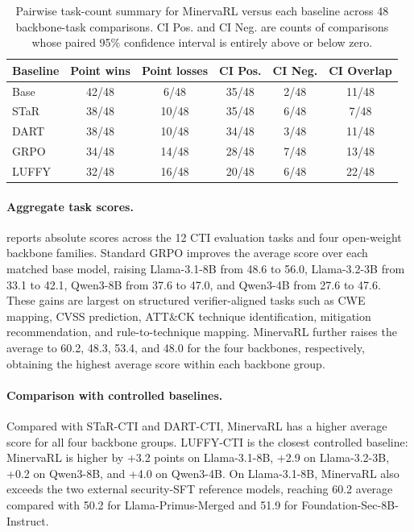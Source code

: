 \begin{table}[t]
\centering
\scriptsize
\caption{Pairwise task-count summary for MinervaRL versus each baseline across 48 backbone-task comparisons. CI Pos. and CI Neg. are counts of comparisons whose paired 95\% confidence interval is entirely above or below zero.}
\label{tab:pairwise-ci-summary}
\setlength{\tabcolsep}{4pt}
\renewcommand{\arraystretch}{0.95}
\begin{tabular}{lccccc}
\toprule
Baseline & Point wins & Point losses & CI Pos. & CI Neg. & CI Overlap \\
\midrule
Base & 42/48 & 6/48 & 35/48 & 2/48 & 11/48 \\
STaR & 38/48 & 10/48 & 35/48 & 6/48 & 7/48 \\
DART & 38/48 & 10/48 & 34/48 & 3/48 & 11/48 \\
GRPO & 34/48 & 14/48 & 28/48 & 7/48 & 13/48 \\
LUFFY & 32/48 & 16/48 & 20/48 & 6/48 & 22/48 \\
\bottomrule
\end{tabular}
\end{table}

\paragraph{Aggregate task scores.}
 reports absolute scores across the 12 CTI evaluation tasks and four open-weight backbone families. Standard GRPO improves the average score over each matched base model, raising Llama-3.1-8B from 48.6 to 56.0, Llama-3.2-3B from 33.1 to 42.1, Qwen3-8B from 37.6 to 47.0, and Qwen3-4B from 27.6 to 47.6. These gains are largest on structured verifier-aligned tasks such as CWE mapping, CVSS prediction, ATT\&CK technique identification, mitigation recommendation, and rule-to-technique mapping. MinervaRL further raises the average to 60.2, 48.3, 53.4, and 48.0 for the four backbones, respectively, obtaining the highest average score within each backbone group.

\paragraph{Comparison with controlled baselines.}
Compared with STaR-CTI and DART-CTI, MinervaRL has a higher average score for all four backbone groups. LUFFY-CTI is the closest controlled baseline: MinervaRL is higher by +3.2 points on Llama-3.1-8B, +2.9 on Llama-3.2-3B, +0.2 on Qwen3-8B, and +4.0 on Qwen3-4B. On Llama-3.1-8B, MinervaRL also exceeds the two external security-SFT reference models, reaching 60.2 average compared with 50.2 for Llama-Primus-Merged and 51.9 for Foundation-Sec-8B-Instruct.

